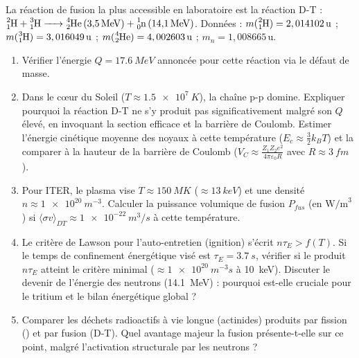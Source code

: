 \documentclass[11pt]{article}
\begin{document}
\begin{exercice}
La réaction de fusion la plus accessible en laboratoire est la réaction D-T : $\ce{^{2}_{1}H + ^{3}_{1}H -> ^{4}_{2}He (3,5 MeV) + ^{1}_{0}n (14,1 MeV)}$.
Données : $m(\ce{^{2}_{1}H}) = 2,014102\,\text{u}$ ; $m(\ce{^{3}_{1}H}) = 3,016049\,\text{u}$ ; $m(\ce{^{4}_{2}He}) = 4,002603\,\text{u}$ ; $m_n = 1,008665\,\text{u}$.
\begin{enumerate}
    \item Vérifier l'énergie $Q = \SI{17,6}{MeV}$ annoncée pour cette réaction via le défaut de masse.
    \item Dans le cœur du Soleil ($T \approx \SI{1,5e7}{K}$), la chaîne p-p domine. Expliquer pourquoi la réaction D-T ne s'y produit pas significativement malgré son $Q$ élevé, en invoquant la section efficace et la barrière de Coulomb. Estimer l'énergie cinétique moyenne des noyaux à cette température ($E_c \approx \frac{3}{2}k_B T$) et la comparer à la hauteur de la barrière de Coulomb ($V_C \approx \frac{Z_1 Z_2 e^2}{4\pi\varepsilon_0 R}$ avec $R \approx \SI{3}{fm}$).
    \item Pour ITER, le plasma vise $T \approx \SI{150}{MK}$ ($\approx \SI{13}{keV}$) et une densité $n \approx \SI{1e20}{m^{-3}}$. Calculer la puissance volumique de fusion $P_{fus}$ (en $\text{W/m}^3$) si $\langle \sigma v \rangle_{DT} \approx \SI{1e-22}{m^3/s}$ à cette température.
    \item Le critère de Lawson pour l'auto-entretien (ignition) s'écrit $n \tau_E > f(T)$. Si le temps de confinement énergétique visé est $\tau_E = \SI{3,7}{s}$, vérifier si le produit $n\tau_E$ atteint le critère minimal ($\approx \SI{1e20}{m^{-3}s}$ à \SI{10}{keV}). Discuter le devenir de l'énergie des neutrons (\SI{14,1}{MeV}) : pourquoi est-elle cruciale pour le tritium et le bilan énergétique global ?
    \item Comparer les déchets radioactifs à vie longue (actinides) produits par fission () et par fusion (D-T). Quel avantage majeur la fusion présente-t-elle sur ce point, malgré l'activation structurale par les neutrons ?
\end{enumerate}
\end{exercice}
\end{document}
